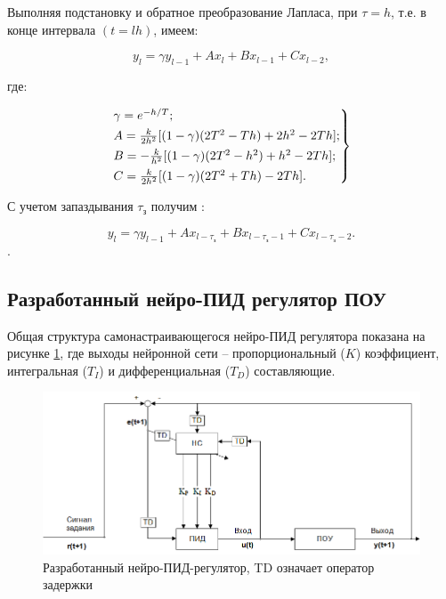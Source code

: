 Выполняя подстановку и обратное преобразование Лапласа, при $\tau = h$, т.е. в конце интервала $(t = lh)$, имеем:

\begin{equation}
    y_l = \gamma y_{l - 1} + Ax_l + Bx_{l - 1} + Cx_{l - 2},
\end{equation}

где:

\begin{equation}
    \begin{rcases}
        \gamma = e^{-h/T};\\
        A = \frac{k}{2h^2}[(1 - \gamma)(2T^2 - Th) + 2h^2 - 2Th];\\
        B = -\frac{k}{h^2}[(1 - \gamma)(2T^2 - h^2) + h^2 - 2Th];\\
        C = \frac{k}{2h^2}[(1 - \gamma)(2T^2 + Th) - 2Th].
    \end{rcases}
\end{equation}

С учетом запаздывания $\tau_\text{з}$ получим \cite{Нетушил1978}:

\begin{equation}
    y_l = \gamma y_{l - 1} + Ax_{l - \tau_\text{з}} + Bx_{l - \tau_\text{з} - 1} + Cx_{l - \tau_\text{з} - 2}.
\end{equation}.

\subsection{Разработанный нейро-ПИД регулятор ПОУ}

Общая структура самонастраивающегося нейро-ПИД регулятора показана на рисунке \ref{fig:neuro_PID_controller}, где выходы нейронной сети – пропорциональный ($K$) коэффициент, интегральная ($T_I$) и дифференциальная ($T_D$) составляющие.

\begin{figure}[H]
    \centering
    \includegraphics[width=\textwidth]{images/chapter_2/Разработанный нейро-контроллер.png}
    \caption{Разработанный нейро-ПИД-регулятор, TD означает оператор задержки}
    \label{fig:neuro_PID_controller}
\end{figure}

